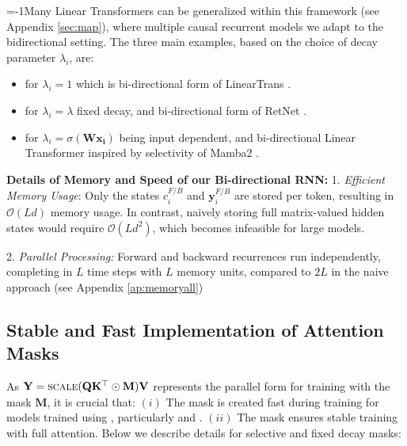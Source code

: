 \looseness=-1Many Linear Transformers can be generalized within this framework (see Appendix \ref{sec:map}), where multiple causal recurrent models we adapt to the bidirectional setting. The three main examples, based on the choice of decay parameter $\lambda_i$, are:
\begin{itemize}
    \item \colorbox{green!10}{\lionlit} for $\lambda_i=1$ which is bi-directional form of LinearTrans \cite{trans_rnn}.
     \item \colorbox{ violet!20}{\lionretnet} for $\lambda_i=\lambda$ fixed decay, and bi-directional form of RetNet \cite{retnet}.
      \item \colorbox{orange!17}{\lions} for $\lambda_i=\sigma(\mathbf{W\mathbf{x}_i})$ being input dependent, and bi-directional Linear Transformer inspired by selectivity of Mamba2 \cite{mamba2}.
\end{itemize}


\textbf{Details of Memory and Speed of our Bi-directional RNN:} 
1. \textit{Efficient Memory Usage}: Only the states \(c^{F/B}_i\) and \(\mathbf{y}^{F/B}_i\) are stored per token, resulting in \(\mathcal{O}(Ld)\) memory usage. In contrast, naively storing full matrix-valued hidden states would require \(\mathcal{O}(Ld^2)\), which becomes infeasible for large models.

2. \textit{Parallel Processing:} Forward and backward recurrences run independently, completing in \(L\) time steps with \(L\) memory units, compared to \(2L\) in the naive approach (see Appendix \ref{ap:memoryall})


\vspace{-3mm}
\subsection{Stable and Fast Implementation of Attention Masks}\label{Method2}

As \(\mathbf{Y} = \textsc{scale}(\mathbf{Q}\mathbf{K}^{\top} \odot \mathbf{M})\mathbf{V}\) represents the parallel form for training with the mask \(\mathbf{M}\), it is crucial that:  
\((i)\) The mask is created fast during training for models trained using \lion, particularly \lions and \lionretnet.  
\((ii)\) The mask ensures stable training with full attention. Below we describe details for selective and fixed decay masks:

